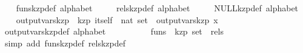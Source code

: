 \begin{isabellebody}
\isanewline
\ \ \isamarkupfalse%
\ funs{}kzp{}def\ {}alphabet{}\isanewline
\ \ \ \ \ rels{}kzp{}def\ {}alphabet{}\isanewline
\ \ \ \ \ NULL{}kzp{}def\ {}alphabet{}\isanewline
\isanewline
\ \ \isamarkupfalse%
\ output{}vars{}kzp\ {}{}\ {}kzp\ itself\ {}\ nat\ set{}\ \ {}output{}vars{}kzp\ x\ {}\ {}{}{}{}\isanewline
\isanewline
\ \ \isamarkupfalse%
\ output{}vars{}kzp{}def\ {}alphabet{}\isanewline
\isanewline
\ \ \isamarkupfalse%
%
\isadelimproof
\ %
\endisadelimproof
%
\isatagproof
{}\isamarkupfalse%
\isanewline
\ \ \ \ \isamarkupfalse%
\ {}{}funs\ {}{}\ kzp\ set{}\ {}\ rels\ {}\ {}{}{}\isanewline
\ \ \ \ \ \ \isamarkupfalse%
\ {}simp\ add{}\ funs{}kzp{}def\ rels{}kzp{}def{}\isanewline

\end{isabellebody}
